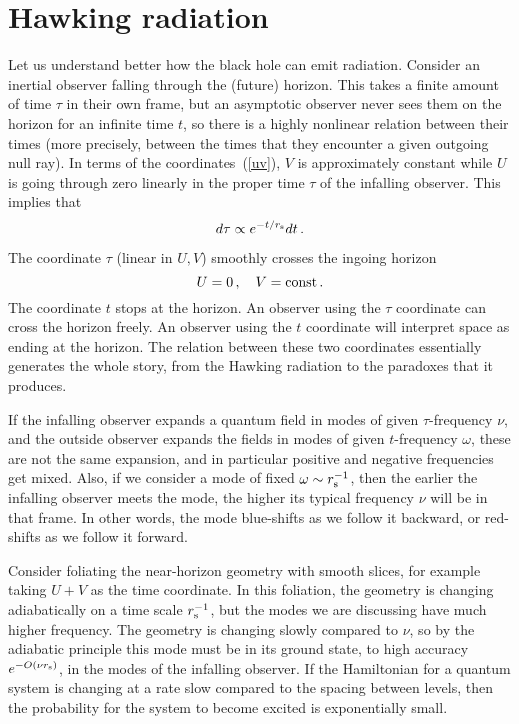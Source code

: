 \documentclass[12pt]{article}
\newcommand{\sect}[1]{\section{#1}\setcounter{equation}{0}}
\newcommand{\be}{\begin{equation}}
\newcommand{\ee}{\end{equation}}
\newcommand{\rmx}{\rm}
\newcommand{\rs}{r_{\rmx s}}
\begin{document}
\sect{Hawking radiation}

Let us understand better how the black hole can emit radiation.  Consider an inertial observer falling through the (future) horizon.  This takes a finite amount of time $\tau$ in their own frame, but an asymptotic observer never sees them on the horizon for an infinite time $t$, so there is a highly nonlinear relation between their times (more precisely, between the times that they encounter a given outgoing null ray).  In terms of the coordinates~(\ref{uv}), $V$ is approximately constant while $U$ is going through zero linearly in the proper time $\tau$ of the infalling observer.  This implies that
\be
d\tau \propto e^{-t/\rs} dt \,.
\ee

The coordinate $\tau$ (linear in $U, V$)  smoothly crosses the ingoing  horizon 
\be
U = 0 \,,\quad V = {\rm const} \,.  
\ee
The coordinate $t$ stops at the horizon.   An observer using the $\tau$ coordinate can cross the horizon freely.  An observer using the $t$ coordinate will interpret space as ending at the horizon.   
The relation between these two coordinates essentially generates the whole story, from the Hawking radiation to the paradoxes that it produces.  


 If the infalling observer expands a quantum field in modes of given $\tau$-frequency $\nu$, and the outside observer expands the fields in modes of given $t$-frequency $\omega$,  these are not the same expansion, and in particular positive and negative frequencies get mixed.  Also, if we consider a mode of fixed $\omega \sim \rs^{-1}$, then the earlier the infalling observer meets the mode, the higher its typical frequency $\nu$ will be in that frame.    In other words, the mode blue-shifts as we follow it backward, or red-shifts as we follow it forward.

Consider foliating the near-horizon geometry with smooth slices, for example taking $U+V$ as the time coordinate.  
In this foliation, the geometry is changing adiabatically on a time scale $\rs^{-1}$, but the modes we are discussing have much higher frequency.  The geometry is changing slowly compared to $\nu$, so by the adiabatic principle this mode must be in its ground state, to high accuracy $e^{-O(\nu\rs)}$, in the modes of the infalling observer.  {If the Hamiltonian for a quantum system is changing at a rate slow compared to the spacing between levels, then the probability for the system to become excited is exponentially small.} 
\end{document}

